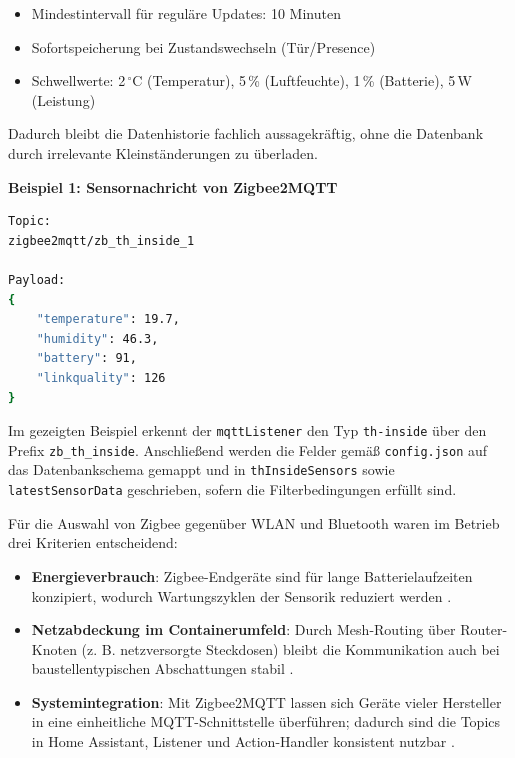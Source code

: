 \begin{itemize}
    \item Mindestintervall für reguläre Updates: 10 Minuten
    \item Sofortspeicherung bei Zustandswechseln (Tür/Presence)
    \item Schwellwerte: 2\,$^{\circ}$C (Temperatur), 5\,\% (Luftfeuchte), 1\,\% (Batterie), 5\,W (Leistung)
\end{itemize}

Dadurch bleibt die Datenhistorie fachlich aussagekräftig, ohne die Datenbank durch irrelevante Kleinständerungen zu überladen.

\textbf{Beispiel 1: Sensornachricht von Zigbee2MQTT}

\begin{lstlisting}[language=bash,caption={Beispiel für Topic und Payload eines Innenklima-Sensors},label={lst:mqtt_sensor_example},basicstyle=\ttfamily\small]
Topic:
zigbee2mqtt/zb_th_inside_1

Payload:
{
    "temperature": 19.7,
    "humidity": 46.3,
    "battery": 91,
    "linkquality": 126
}
\end{lstlisting}

Im gezeigten Beispiel erkennt der \texttt{mqttListener} den Typ \texttt{th-inside} über den Prefix \texttt{zb\_th\_inside}. Anschließend werden die Felder gemäß \texttt{config.json} auf das Datenbankschema gemappt und in \texttt{thInsideSensors} sowie \texttt{latestSensorData} geschrieben, sofern die Filterbedingungen erfüllt sind.

Für die Auswahl von Zigbee gegenüber WLAN und Bluetooth waren im Betrieb drei Kriterien entscheidend:

\begin{itemize}
    \item \textbf{Energieverbrauch}: Zigbee-Endgeräte sind für lange Batterielaufzeiten konzipiert, wodurch Wartungszyklen der Sensorik reduziert werden \cite{csa_zigbee_overview}.
    \item \textbf{Netzabdeckung im Containerumfeld}: Durch Mesh-Routing über Router-Knoten (z. B. netzversorgte Steckdosen) bleibt die Kommunikation auch bei baustellentypischen Abschattungen stabil \cite{digi_zigbee_mesh}.
    \item \textbf{Systemintegration}: Mit Zigbee2MQTT lassen sich Geräte vieler Hersteller in eine einheitliche MQTT-Schnittstelle überführen; dadurch sind die Topics in Home Assistant, Listener und Action-Handler konsistent nutzbar \cite{zigbee2mqtt_docs}.
\end{itemize}

